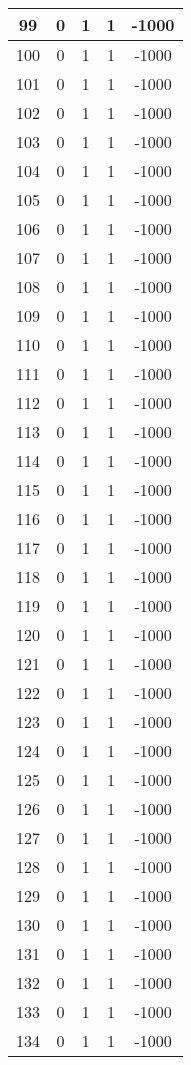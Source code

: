 \documentclass[letterpaper, 12pt]{article}
\begin{document}
\begin{longtable}{|c|c|c|c|c|}
\hline
99 & 0 & 1 & 1 & -1000 \\
\hline
100 & 0 & 1 & 1 & -1000 \\
\hline
101 & 0 & 1 & 1 & -1000 \\
\hline
102 & 0 & 1 & 1 & -1000 \\
\hline
103 & 0 & 1 & 1 & -1000 \\
\hline
104 & 0 & 1 & 1 & -1000 \\
\hline
105 & 0 & 1 & 1 & -1000 \\
\hline
106 & 0 & 1 & 1 & -1000 \\
\hline
107 & 0 & 1 & 1 & -1000 \\
\hline
108 & 0 & 1 & 1 & -1000 \\
\hline
109 & 0 & 1 & 1 & -1000 \\
\hline
110 & 0 & 1 & 1 & -1000 \\
\hline
111 & 0 & 1 & 1 & -1000 \\
\hline
112 & 0 & 1 & 1 & -1000 \\
\hline
113 & 0 & 1 & 1 & -1000 \\
\hline
114 & 0 & 1 & 1 & -1000 \\
\hline
115 & 0 & 1 & 1 & -1000 \\
\hline
116 & 0 & 1 & 1 & -1000 \\
\hline
117 & 0 & 1 & 1 & -1000 \\
\hline
118 & 0 & 1 & 1 & -1000 \\
\hline
119 & 0 & 1 & 1 & -1000 \\
\hline
120 & 0 & 1 & 1 & -1000 \\
\hline
121 & 0 & 1 & 1 & -1000 \\
\hline
122 & 0 & 1 & 1 & -1000 \\
\hline
123 & 0 & 1 & 1 & -1000 \\
\hline
124 & 0 & 1 & 1 & -1000 \\
\hline
125 & 0 & 1 & 1 & -1000 \\
\hline
126 & 0 & 1 & 1 & -1000 \\
\hline
127 & 0 & 1 & 1 & -1000 \\
\hline
128 & 0 & 1 & 1 & -1000 \\
\hline
129 & 0 & 1 & 1 & -1000 \\
\hline
130 & 0 & 1 & 1 & -1000 \\
\hline
131 & 0 & 1 & 1 & -1000 \\
\hline
132 & 0 & 1 & 1 & -1000 \\
\hline
133 & 0 & 1 & 1 & -1000 \\
\hline
134 & 0 & 1 & 1 & -1000 \\

\end{longtable}
\end{document}
